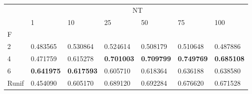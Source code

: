 \begin{table}[htbp]
\centering
\label{nursery-results}
\begin{tabular}{lllllll}
\toprule
 & \multicolumn{6}{c}{NT} \\
 & 1 & 10 & 25 & 50 & 75 & 100 \\
F &  &  &  &  &  &  \\
\midrule
2 & 0.483565 & 0.530864 & 0.524614 & 0.508179 & 0.510648 & 0.487886 \\
4 & 0.471759 & 0.615278 & \textbf{0.701003} & \textbf{0.709799} & \textbf{0.749769} & \textbf{0.685108} \\
6 & \textbf{0.641975} & \textbf{0.617593} & 0.605710 & 0.618364 & 0.636188 & 0.638580 \\
Runif & 0.454090 & 0.605170 & 0.689120 & 0.692284 & 0.676620 & 0.671528 \\
\bottomrule
\end{tabular}
\end{table}
